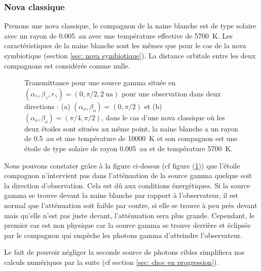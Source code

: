 \documentclass[a4paper,12pt,twoside]{article}
\begin{document}
\subsubsection{Nova classique}\label{sec: nova classique}

Prenons une nova classique, le compagnon de la naine blanche est de type solaire avec un rayon de \SI{0.005}{\astronomicalunit} avec une température effective de \SI{5700}{\K}. Les caractéristiques de la naine blanche sont les mêmes que pour le cas de la nova symbiotique (section \ref{sec: nova symbiotique}). La distance orbitale entre les deux compagnons est considérée comme nulle.

\begin{figure}[H]
	\centering
    \hfill
    \hfill    \caption{Transmittance pour une source gamma située en $(\alpha_\gamma, \beta_\gamma, r_\gamma) = (0, \pi/2, \SI{2}{\astronomicalunit})$ pour une observation dans deux directions : (a) $(\alpha_o, \beta_o) = (0, \pi/2)$ et (b) $(\alpha_o, \beta_o) = (\pi/4, \pi/2)$, dans le cas d'une nova classique où les deux étoiles sont situées au même point, la naine blanche a un rayon de \SI{0.5}{\astronomicalunit} et une température de \SI{10000}{\K} et son compagnon est une étoile de type solaire de rayon \SI{0.005}{\astronomicalunit} et de température \SI{5700}{\K}.}
    \label{fig: classique}
\end{figure}

Nous pouvons constater grâce à la figure ci-dessus (cf figure (\ref{fig: classique})) que l'étoile compagnon n'intervient pas dans l'atténuation de la source gamma quelque soit la direction d'observation. Cela est dû  aux conditions énergétiques. Si la source gamma se trouve devant la naine blanche par rapport à l'observateur, il est normal que l'atténuation soit faible par contre, si elle se trouve à peu près devant mais qu'elle n'est pas juste devant, l'atténuation sera plus grande. Cependant, le premier cas est non physique car la source gamma se trouve derrière et éclipsée par le compagnon qui empèche les photons gamma d'atteindre l'observateur.

Le fait de pouvoir négliger la seconde source de photons cibles simplifiera nos calculs numériques par la suite (cf section \ref{sec: choc en progression}).
\newpage
\end{document}
